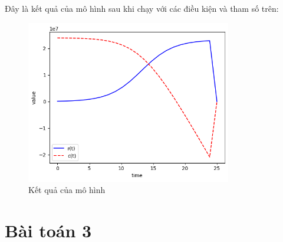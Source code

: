 \documentclass[a4paper,12pt]{report}
\begin{document}
\begin{flushleft}
	Đây là kết quả của mô hình sau khi chạy với các điều kiện và tham số trên:
	\begin{figure}[H]
		\centering
		\includegraphics[width = 0.8\textwidth]{images/ode_problem2.png}
		\caption{Kết quả của mô hình}
	\end{figure}
\end{flushleft}


\newpage

\chapter{Bài toán 3} %
\label{cha:bài_toán_3}
\end{document}
